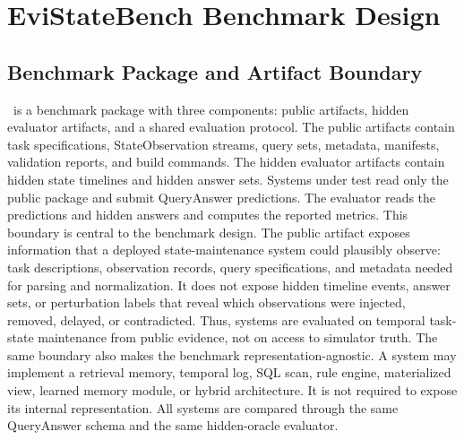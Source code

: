 
\section{EviStateBench Benchmark Design}
\label{sec:benchmark}

\subsection{Benchmark Package and Artifact Boundary}

\bench\ is a benchmark package with three components: public artifacts, hidden evaluator artifacts, and a shared evaluation protocol. The public artifacts contain task specifications, StateObservation streams, query sets, metadata, manifests, validation reports, and build commands. The hidden evaluator artifacts contain hidden state timelines and hidden answer sets. Systems under test read only the public package and submit QueryAnswer predictions. The evaluator reads the predictions and hidden answers and computes the reported metrics.
This boundary is central to the benchmark design. The public artifact exposes information that a deployed state-maintenance system could plausibly observe: task descriptions, observation records, query specifications, and metadata needed for parsing and normalization. It does not expose hidden timeline events, answer sets, or perturbation labels that reveal which observations were injected, removed, delayed, or contradicted. Thus, systems are evaluated on temporal task-state maintenance from public evidence, not on access to simulator truth.
The same boundary also makes the benchmark representation-agnostic. A system may implement a retrieval memory, temporal log, SQL scan, rule engine, materialized view, learned memory module, or hybrid architecture. It is not required to expose its internal representation. All systems are compared through the same QueryAnswer schema and the same hidden-oracle evaluator.

